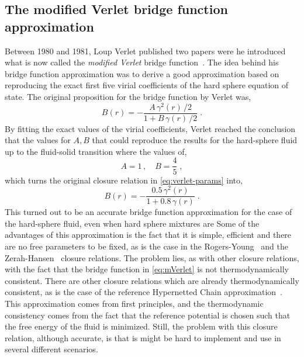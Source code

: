 \subsection{The modified Verlet bridge function approximation}
Between 1980 and 1981, Loup Verlet published two papers were he introduced what is now 
called the \emph{modified Verlet} bridge 
function~\cite{verletIntegralEquationsClassical1980,verletIntegralEquationsClassical1981}. 
The idea behind his bridge function approximation was to derive a good approximation based 
on reproducing the exact first five virial coefficients of the hard sphere equation of 
state. The original proposition for the bridge function by Verlet was,
\begin{equation}
    B(r) = - \frac{A \, \gamma^{2}(r) \, / 2}{1 + B \, \gamma(r) \, / 2}
    \; .
    \label{eq:verlet-params}
\end{equation}
By fitting the exact values of the virial coefficients, Verlet reached the conclusion that 
the values for \(A, B\) that could reproduce the results for the hard-sphere fluid up to 
the fluid-solid transition where the values of,
\begin{equation}
    A = 1 \, , \quad B = \frac{4}{5}
    \; ,
    \label{eq:ab-verlet}
\end{equation}
which turns the original closure relation in \autoref{eq:verlet-params} into,
\begin{equation}
    B(r) = - \frac{0.5 \, \gamma^{2}(r)}{1 + 0.8 \, \gamma(r)}
    \; .
    \label{eq:mVerlet}
\end{equation}
This turned out to be an accurate bridge function approximation for the case of the 
hard-sphere fluid, even when hard sphere mixtures are 
Some of the advantages of this approximation is the fact that it is simple, efficient and 
there are no free parameters to be fixed, as is the case in the 
Rogers-Young~\cite{rogersNewThermodynamicallyConsistent1984b} and the 
Zerah-Hansen~\cite{zerahSelfConsistentIntegral1986} closure relations. The problem lies, as 
with other closure relations, with the fact that the bridge function in 
\autoref{eq:mVerlet} is not thermodynamically consistent. There are other closure relations 
which are already thermodynamically consistent, as is the case of the reference Hypernetted 
Chain approximation~\cite{ladoSolutionsReferencehypernettedchainEquation1983}. This 
approximation comes from first principles, and the thermodynamic consistency comes from the 
fact that the reference potential is chosen such that the free energy of the fluid is 
minimized. Still, the problem with this closure relation, although accurate, is that is 
might be hard to implement and use in several different scenarios.

